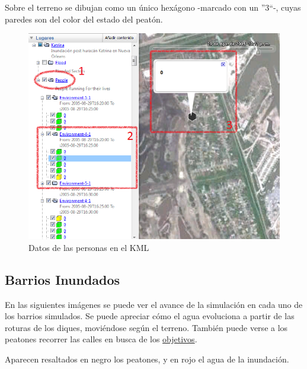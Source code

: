 Sobre el terreno se dibujan como un único hexágono -marcado con un ''3``-,
cuyas paredes son del color del estado del peatón.

\begin{figure}[H]
 \centering
 \includegraphics[width=130mm]{figuras/cap6/resultados/people_data.png}
 \caption{Datos de las personas en el KML}
\end{figure}

\subsection{Barrios Inundados}

En las siguientes imágenes se puede ver el avance de la simulación en cada uno
de los barrios simulados. Se puede apreciar cómo el agua evoluciona a partir de
las roturas de los diques, moviéndose según el terreno. También puede verse a
los peatones recorrer las calles en busca de los
\hyperref[objetivos]{objetivos}.

Aparecen resaltados en negro los peatones, y en rojo el agua de la inundación.

